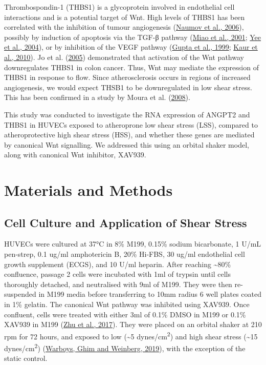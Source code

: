 \documentclass[
  11pt,
]{article}
\begin{document}
Thrombospondin-1 (THBS1) is a glycoprotein involved in endothelial cell interactions and is a potential target of Wnt.
High levels of THBS1 has been correlated with the inhibition of tumour angiogenesis (\protect\hyperlink{ref-naumov2006}{Naumov et al., 2006}), possibly by induction of apoptosis via the TGF-β pathway (\protect\hyperlink{ref-Miao2001}{Miao et al., 2001}; \protect\hyperlink{ref-yee2004}{Yee et al., 2004}), or by inhibition of the VEGF pathway (\protect\hyperlink{ref-gupta1999}{Gupta et al., 1999}; \protect\hyperlink{ref-kaur2010}{Kaur et al., 2010}).
Jo et al. (\protect\hyperlink{ref-jo2005}{2005}) demonstrated that activation of the Wnt pathway downregulates THBS1 in colon cancer.
Thus, Wnt may mediate the expression of THBS1 in response to flow.
Since atherosclerosis occurs in regions of increased angiogenesis, we would expect THSB1 to be downregulated in low shear stress.
This has been confirmed in a study by Moura et al. (\protect\hyperlink{ref-Moura2008}{2008}).

This study was conducted to investigate the RNA expression of ANGPT2 and THBS1 in HUVECs exposed to atheroprone low shear stress (LSS), compared to atheroprotective high shear stress (HSS), and whether these genes are mediated by canonical Wnt signalling.
We addressed this using an orbital shaker model, along with canonical Wnt inhibitor, XAV939.

\hypertarget{materials-and-methods}{%
\section{Materials and Methods}\label{materials-and-methods}}

\hypertarget{cell-culture-and-application-of-shear-stress}{%
\subsection{Cell Culture and Application of Shear Stress}\label{cell-culture-and-application-of-shear-stress}}

HUVECs were cultured at 37°C in 8\% M199, 0.15\% sodium bicarbonate, 1 U/mL pen-strep, 0.1 ug/ml amphotericin B, 20\% Hi-FBS, 30 ug/ml endothelial cell growth supplement (ECGS), and 10 U/ml heparin.
After reaching \textasciitilde80\% confluence, passage 2 cells were incubated with 1ml of trypsin until cells thoroughly detached, and neutralised with 9ml of M199.
They were then re-suspended in M199 media before transferring to 10mm radius 6 well plates coated in 1\% gelatin.
The canonical Wnt pathway was inhibited using XAV939.
Once confluent, cells were treated with either 3ml of 0.1\% DMSO in M199 or 0.1\% XAV939 in M199 (\protect\hyperlink{ref-Zhu2017}{Zhu et al., 2017}).
They were placed on an orbital shaker at 210 rpm for 72 hours, and exposed to low (\textasciitilde5 dynes/cm\textsuperscript{2}) and high shear stress (\textasciitilde15 dynes/cm\textsuperscript{2}) (\protect\hyperlink{ref-Warboys2019}{Warboys, Ghim and Weinberg, 2019}), with the exception of the static control.
\end{document}
